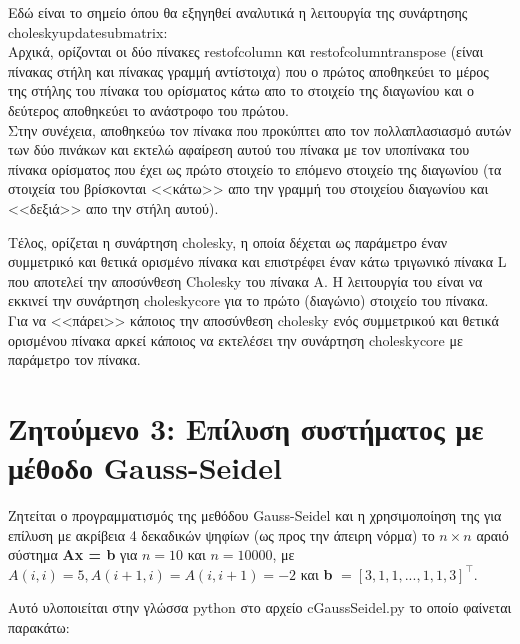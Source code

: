 \documentclass[a4paper,11pt]{article}
\newcommand{\lt}{\latintext}
\newcommand{\gt}{\greektext}
\begin{document}
\par
Εδώ είναι το σημείο όπου θα εξηγηθεί αναλυτικά η λειτουργία της συνάρτησης {\lt cholesky\textunderscore update\textunderscore submatrix}:\\
Αρχικά, ορίζονται οι δύο πίνακες {\lt rest\textunderscore of\textunderscore column} και {\lt rest\textunderscore of\textunderscore column\textunderscore transpose} (είναι πίνακας στήλη και πίνακας γραμμή αντίστοιχα) που ο πρώτος αποθηκεύει το μέρος της στήλης του πίνακα του ορίσματος κάτω απο το στοιχείο της διαγωνίου και ο δεύτερος αποθηκεύει το ανάστροφο του πρώτου.\\
Στην συνέχεια, αποθηκεύω τον πίνακα που προκύπτει απο τον πολλαπλασιασμό αυτών των δύο πινάκων και εκτελώ αφαίρεση αυτού του πίνακα με τον υποπίνακα του πίνακα ορίσματος που έχει ως πρώτο στοιχείο το επόμενο στοιχείο της διαγωνίου (τα στοιχεία του βρίσκονται <<κάτω>> απο την γραμμή του στοιχείου διαγωνίου και <<δεξιά>> απο την στήλη αυτού).\\

\par
Τέλος, ορίζεται η συνάρτηση {\lt cholesky}, η οποία δέχεται ως παράμετρο έναν συμμετρικό και θετικά ορισμένο πίνακα και επιστρέφει έναν κάτω τριγωνικό πίνακα {\lt L} που αποτελεί την αποσύνθεση {\lt Cholesky} του πίνακα A. Η λειτουργία του είναι να εκκινεί την συνάρτηση {\lt cholesky\textunderscore core} για το πρώτο (διαγώνιο) στοιχείο του πίνακα. Για να <<πάρει>> κάποιος την αποσύνθεση {\lt cholesky} ενός συμμετρικού και θετικά ορισμένου πίνακα αρκεί κάποιος να εκτελέσει την συνάρτηση {\lt cholesky\textunderscore core} με παράμετρο τον πίνακα.

\section*{Ζητούμενο 3: Επίλυση συστήματος με μέθοδο {\lt Gauss-Seidel}}
Ζητείται ο προγραμματισμός της μεθόδου {\lt Gauss-Seidel} και η χρησιμοποίηση της για επίλυση με ακρίβεια 4 δεκαδικών ψηφίων (ως προς την άπειρη νόρμα) το {\lt $n \times n$} αραιό σύστημα \textbf{\lt Ax = b} για {\lt $n = 10$} και {\lt $n = 10000$}, με {\lt $A(i, i) = 5, A(i + 1, i) = A(i, i + 1) = −2$} και \textbf{\lt b} $= [3, 1, 1, . . . , 1, 1, 3] ^\top $.

Αυτό υλοποιείται στην γλώσσα {\lt python} στο αρχείο {\lt c\textunderscore Gauss\textunderscore Seidel.py} το οποίο φαίνεται παρακάτω:

\lt

\gt
\end{document}
